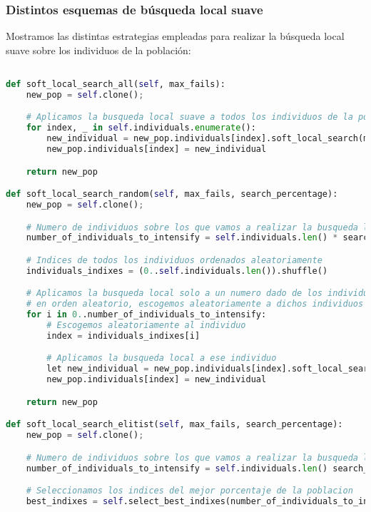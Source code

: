 \documentclass[11pt]{article}
\begin{document}
\subsubsection{Distintos esquemas de búsqueda local suave}

Mostramos las distintas estrategias empleadas para realizar la búsqueda local suave sobre los individuos de la población:

\begin{lstlisting}[language=Python, style=Boxed]

def soft_local_search_all(self, max_fails):
    new_pop = self.clone();

    # Aplicamos la busqueda local suave a todos los individuos de la poblacion
    for index, _ in self.individuals.enumerate():
        new_individual = new_pop.individuals[index].soft_local_search(max_fails);
        new_pop.individuals[index] = new_individual

    return new_pop

def soft_local_search_random(self, max_fails, search_percentage):
    new_pop = self.clone();

    # Numero de individuos sobre los que vamos a realizar la busqueda local suave
    number_of_individuals_to_intensify = self.individuals.len() * search_percentage

    # Indices de todos los individuos ordenados aleatoriamente
    individuals_indixes = (0..self.individuals.len()).shuffle()

    # Aplicamos la busqueda local solo a un numero dado de los individuos. Usando los indices
    # en orden aleatorio, escogemos aleatoriamente a dichos individuos
    for i in 0..number_of_individuals_to_intensify:
        # Escogemos aleatoriamente al individuo
        index = individuals_indixes[i]

        # Aplicamos la busqueda local a ese individuo
        let new_individual = new_pop.individuals[index].soft_local_search(max_fails);
        new_pop.individuals[index] = new_individual

    return new_pop

def soft_local_search_elitist(self, max_fails, search_percentage):
    new_pop = self.clone();

    # Numero de individuos sobre los que vamos a realizar la busqueda local suave
    number_of_individuals_to_intensify = self.individuals.len() search_percentage

    # Seleccionamos los indices del mejor porcentaje de la poblacion
    best_indixes = self.select_best_indixes(number_of_individuals_to_intensify);


\end{lstlisting}
\end{document}
